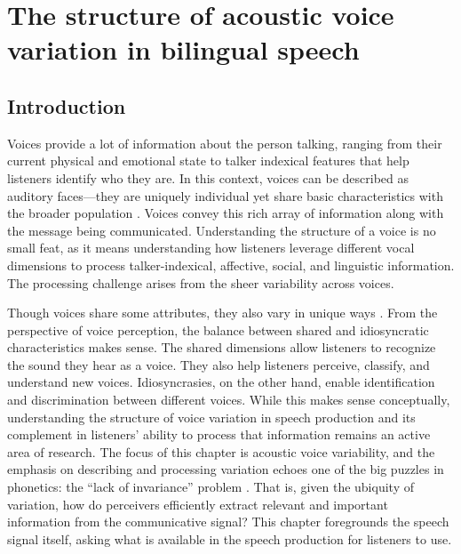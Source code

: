 \setcounter{chapter}{2}
\setcounter{page}{1}
\chapter{The structure of acoustic voice variation in bilingual speech}
\label{ch3:Voice}

\section{Introduction}\label{ch3:sec:introduction}

Voices provide a lot of information about the person talking, ranging from their current physical and emotional state to talker indexical features that help listeners identify who they are. In this context, voices can be described as auditory faces---they are uniquely individual yet share basic characteristics with the broader population \citep{belin_2004_voice}. Voices convey this rich array of information along with the message being communicated. Understanding the structure of a voice is no small feat, as it means understanding how listeners leverage different vocal dimensions to process talker-indexical, affective, social, and linguistic information. The processing challenge arises from the sheer variability across voices. 

Though voices share some attributes, they also vary in unique ways \citep{lee_2019_acoustic}. From the perspective of voice perception, the balance between shared and idiosyncratic characteristics makes sense. The shared dimensions allow listeners to recognize the sound they hear as a voice. They also help listeners perceive, classify, and understand new voices. Idiosyncrasies, on the other hand, enable identification and discrimination between different voices. While this makes sense conceptually, understanding the structure of voice variation in speech production and its complement in listeners' ability to process that information remains an active area of research. The focus of this chapter is acoustic voice variability, and the emphasis on describing and processing variation echoes one of the big puzzles in phonetics: the ``lack of invariance'' problem \citep{liberman_1967_perception}. That is, given the ubiquity of variation, how do perceivers efficiently extract relevant and important information from the communicative signal? This chapter foregrounds the speech signal itself, asking what is available in the speech production for listeners to use. 

